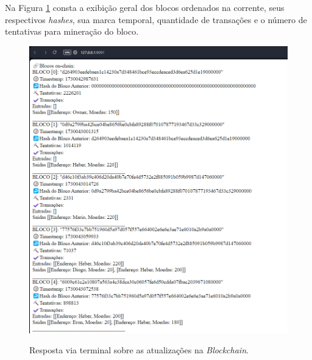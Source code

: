 Na Figura \ref*{fig:navegador} consta a exibição geral dos blocos ordenados na corrente, seus respectivos \textit{hashes}, sua marca temporal, quantidade de transações e o número de tentativas para mineração do bloco.

\begin{figure} [h]
	\centering
	\caption{Resposta via terminal sobre as atualizações na \textit{Blockchain}.}
	\includegraphics[width=1\linewidth]{../images/navegador-blockchain.png}
	\label{fig:navegador}

\end{figure}


